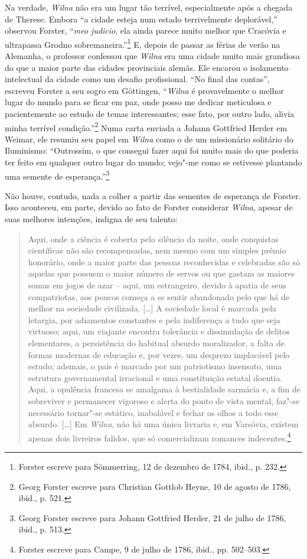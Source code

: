 Na verdade, \textit{Wilna} não era um lugar tão terrível, especialmente após a
chegada de Therese. Embora ``a cidade esteja num estado terrivelmente
deplorável,'' observou Forster, ``\textit{meo judicio}, ela ainda parece
muito melhor que Cracóvia e ultrapassa Grodno sobremaneira.''\footnote{Forster escreve para Sömmerring, 12 de dezembro de 1784, ibid., p. 232.} E, depois de passar as férias de verão na Alemanha, o professor confessou
que \textit{Wilna} era uma cidade muito mais grandiosa do que a maior parte das
cidades provinciais alemãs. Ele encarou o isolamento intelectual da
cidade como um desafio profissional. ``No final das contas'', escreveu
Forster a seu sogro em Göttingen, ``\textit{Wilna} é provavelmente o melhor lugar
do mundo para se ficar em paz, onde posso me dedicar meticulosa e
pacientemente ao estudo de temas interessantes; esse fato, por outro
lado, alivia minha terrível condição.''\footnote{Georg Forster escreve para Christian Gottlob Heyne, 10 de agosto de 1786, ibid., p. 521.} Numa carta enviada a Johann Gottfried Herder em Weimar, ele resumiu seu
papel em \textit{Wilna} como o de um missionário solitário do Iluminismo:
``Outrossim, o que consegui fazer aqui foi muito mais do que poderia ter
feito em qualquer outro lugar do mundo; vejo"-me como se estivesse
plantando uma semente de esperança.''\footnote{Georg Forster escreve para Johann Gottfried Herder, 21 de julho de 1786, ibid., p. 513.}

Não houve, contudo, nada a colher a partir das sementes de esperança de
Forster. Isso aconteceu, em parte, devido ao fato de Forster considerar
\textit{Wilna}, apesar de suas melhores intenções, indigna de seu talento:

\begin{quote}
Aqui, onde a ciência é coberta pelo silêncio da noite, onde conquistas
científicas não são recompensadas, nem mesmo com um simples prêmio
honorário, onde a maior parte das pessoas reconhecidas e celebradas são
só aquelas que possuem o maior número de servos ou que gastam as maiores
somas em jogos de azar -- aqui, um estrangeiro, devido à apatia de seus
compatriotas, aos poucos começa a se sentir abandonado pelo que há de
melhor na sociedade civilizada. [\ldots{}] A sociedade local é marcada
pela letargia, por adiamentos constantes e pela indiferença a tudo que
seja virtuoso; aqui, um viajante encontra tolerância e dissimulação de
delitos elementares, a persistência do habitual absurdo moralizador, a
falta de formas modernas de educação e, por vezes, um desprezo
implacável pelo estudo; ademais, o país é marcado por um patriotismo
insensato, uma estrutura governamental irracional e uma constituição
estatal doentia. Aqui, a opulência francesa se amalgama à bestialidade
sarmácia e, a fim de sobreviver e permanecer vigoroso e alerta do
ponto de vista mental, faz"-se necessário tornar"-se estático, inabalável
e fechar os olhos a todo esse absurdo. [\ldots{}] Em \textit{Wilna}, não há uma única
livraria e, em Varsóvia, existem apenas dois livreiros falidos, que só
comercializam romances indecentes.\footnote{Forster escreve para Campe, 9 de julho de 1786, ibid., pp. 502--503.} 
\end{quote}

